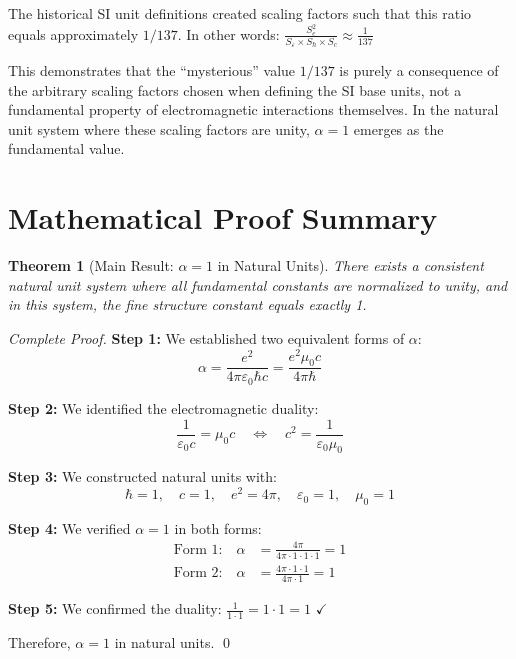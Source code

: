\documentclass[12pt,a4paper]{article}
\newcommand{\alphaem}{\alpha}
\newtheorem{theorem}{Theorem}[section]
\begin{document}
	The historical SI unit definitions created scaling factors such that this ratio equals approximately $1/137$. In other words:
	$\frac{S_e^2}{S_{\varepsilon} \times S_{\hbar} \times S_c} \approx \frac{1}{137}$
	
	This demonstrates that the ``mysterious'' value $1/137$ is purely a consequence of the arbitrary scaling factors chosen when defining the SI base units, not a fundamental property of electromagnetic interactions themselves. In the natural unit system where these scaling factors are unity, $\alpha = 1$ emerges as the fundamental value.
	
	\section{Mathematical Proof Summary}
	
	\begin{theorem}[Main Result: $\alpha = 1$ in Natural Units]
		There exists a consistent natural unit system where all fundamental constants are normalized to unity, and in this system, the fine structure constant equals exactly 1.
	\end{theorem}
	
	\begin{proof}[Complete Proof]
		\textbf{Step 1:} We established two equivalent forms of $\alpha$:
		$$\alphaem = \frac{e^2}{4\pi\varepsilon_0\hbar c} = \frac{e^2 \mu_0 c}{4\pi \hbar}$$
		
		\textbf{Step 2:} We identified the electromagnetic duality:
		$$\frac{1}{\varepsilon_0 c} = \mu_0 c \quad \Leftrightarrow \quad c^2 = \frac{1}{\varepsilon_0\mu_0}$$
		
		\textbf{Step 3:} We constructed natural units with:
		$$\hbar = 1, \quad c = 1, \quad e^2 = 4\pi, \quad \varepsilon_0 = 1, \quad \mu_0 = 1$$
		
		\textbf{Step 4:} We verified $\alpha = 1$ in both forms:
		\begin{align}
			\text{Form 1:} \quad \alphaem &= \frac{4\pi}{4\pi \cdot 1 \cdot 1 \cdot 1} = 1\\
			\text{Form 2:} \quad \alphaem &= \frac{4\pi \cdot 1 \cdot 1}{4\pi \cdot 1} = 1
		\end{align}
		
		\textbf{Step 5:} We confirmed the duality: $\frac{1}{1 \cdot 1} = 1 \cdot 1 = 1$ $\checkmark$
		
		Therefore, $\alpha = 1$ in natural units. \qed
	\end{proof}
	
\end{document}
